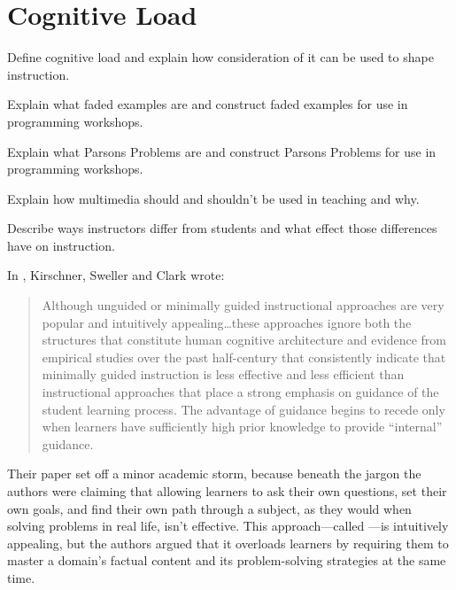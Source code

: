 \chapter{Cognitive Load}\label{s:load}

\begin{objectives}

\item Define cognitive load and explain how consideration of it can be
  used to shape instruction.

\item Explain what faded examples are and construct faded examples for
  use in programming workshops.

\item Explain what Parsons Problems are and construct Parsons Problems
  for use in programming workshops.

\item Explain how multimedia should and shouldn't be used in teaching
  and why.

\item Describe ways instructors differ from students and what effect
  those differences have on instruction.

\end{objectives}

In \cite{Kirs2006}, Kirschner, Sweller and Clark wrote:

\begin{quote}

  Although unguided or minimally guided instructional approaches are
  very popular and intuitively appealing{\ldots}these approaches
  ignore both the structures that constitute human cognitive
  architecture and evidence from empirical studies over the past
  half-century that consistently indicate that minimally guided
  instruction is less effective and less efficient than instructional
  approaches that place a strong emphasis on guidance of the student
  learning process. The advantage of guidance begins to recede only
  when learners have sufficiently high prior knowledge to provide
  ``internal'' guidance.

\end{quote}

Their paper set off a minor academic storm, because beneath the jargon
the authors were claiming that allowing learners to ask their own
questions, set their own goals, and find their own path through a
subject, as they would when solving problems in real life, isn't
effective.  This approach---called
---is
intuitively appealing, but the authors argued that it overloads
learners by requiring them to master a domain's factual content and
its problem-solving strategies at the same time.

